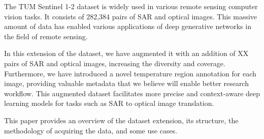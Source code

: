 The TUM Sentinel 1-2 dataset\cite{tumsen12} is widely used in various remote sensing computer vision tasks. It consists of 282,384 pairs of SAR and optical images. This massive amount of data has enabled various applications of deep generative networks in the field of remote sensing\cite{Zhang2023}.

In this extension of the dataset, we have augmented it with an addition of XX pairs of SAR and optical images, increasing the diversity and coverage. Furthermore, we have introduced a novel temperature region annotation for each image, providing valuable metadata that we believe will enable better research workflow. This augmented dataset facilitates more precise and context-aware deep learning models for tasks such as SAR to optical image translation.

This paper provides an overview of the dataset extension, its structure, the methodology of acquiring the data, and some use cases.